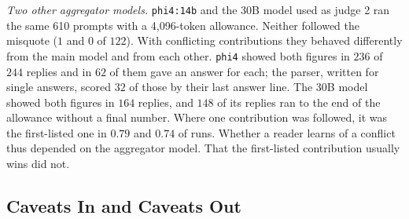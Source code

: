 \documentclass[10pt,twocolumn]{article}
\begin{document}
\emph{Two other aggregator models.} \texttt{phi4:14b} and the 30B model
used as judge 2 ran the same 610 prompts with a 4{,}096-token
allowance. Neither followed the misquote ($1$ and $0$ of $122$). With
conflicting contributions they behaved differently from the main model
and from each other. \texttt{phi4} showed both figures in $236$ of
$244$ replies and in $62$ of them gave an answer for each; the parser,
written for single answers, scored $32$ of those by their last answer
line. The 30B model showed both figures in $164$ replies, and $148$ of
its replies ran to the end of the allowance without a final number.
Where one contribution
was followed, it was the first-listed one in $0.79$ and $0.74$ of runs.
Whether a reader learns of a conflict thus depended on the aggregator
model. That the first-listed contribution usually wins did not.

\subsection{Caveats In and Caveats Out}
\label{sec:transport}
\end{document}
